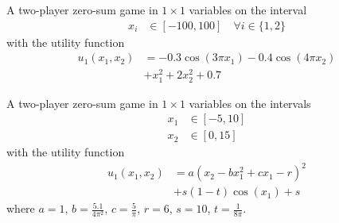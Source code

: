 \noindent
\begin{minipage}[c]{0.6\textwidth}
\begin{game}\label{ex.surjanovic.boha1}
A two-player zero-sum game in $1 \times 1$ variables on the interval
\begin{align*}
    x_i &\in [-100,100] \quad \forall i \in \{1,2\}
\end{align*}
with the utility function \cite[Bohachevsky 1]{surjanovic13}
\begin{align*}
u_{1}( x_{1}, x_{2}) &= - 0.3\cos(3\pi x_1) - 0.4\cos(4 \pi x_2) \\ &+  x_1^2 + 2 x_2^2 + 0.7
\end{align*}
\end{game}
\strut
\end{minipage}
\hfill
\begin{minipage}[c]{0.35\textwidth}
\end{minipage}




\noindent
\begin{minipage}[c]{0.6\textwidth}
\begin{game}\label{ex.surjanovic.branin}
A two-player zero-sum game in $1 \times 1$ variables on the intervals
\begin{align*}
    x_1 &\in [-5,10] \\
    x_2 &\in [0,15]
\end{align*}
with the utility function \cite[Branin]{surjanovic13}
\begin{align*}
u_{1}( x_{1}, x_{2} ) &= a (x_2 - b  x_1^2 + c  x_1 - r)^2 \\ &+  s (1 - t) \cos(x_1) + s
\end{align*}
where $a=1$, $b=\frac{5.1}{4 \pi^2}$, $c=\frac{5}{\pi}$, $r=6$, $s=10$, $t=\frac{1}{8\pi}$.

\end{game}
\strut
\end{minipage}
\hfill
\begin{minipage}[c]{0.35\textwidth}
\end{minipage}





